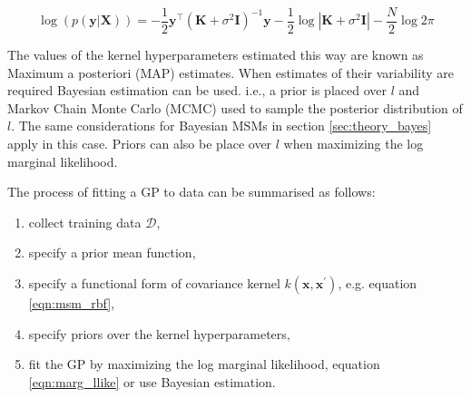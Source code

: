 \begin{equation}\label{eqn:marg_llike}
\log{\left( p(\mathbf{y} | \mathbf{X})\right)}=-\frac{1}{2} \mathbf{y}^{\top}\left(\mathbf{K}+\sigma^{2} \mathbf{I}\right)^{-1} \mathbf{y}-\frac{1}{2} \log \left|\mathbf{K}+\sigma^{2} \mathbf{I}\right|-\frac{N}{2} \log 2 \pi
\end{equation}

The values of the kernel hyperparameters estimated this way are known as Maximum a posteriori (MAP) estimates.\cite{rasmussenGaussianProcessesMachine2006} When estimates of their variability are required Bayesian estimation can be used.\cite{gelmanBayesianDataAnalysis2014} i.e., a prior is placed over $l$ and Markov Chain Monte Carlo (MCMC) used to sample the posterior distribution of $l$. The same considerations for Bayesian MSMs in section \ref{sec:theory_bayes} apply in this case. Priors can also be place over $l$ when maximizing the log marginal likelihood.\cite{rasmussenGaussianProcessesMachine2006}

The process of fitting a GP to data can be summarised as follows:
\begin{enumerate}
    \item collect training data $\mathcal{D}$, 
    \item specify a prior mean function, 
    \item  specify a functional form of covariance kernel $k(\mathbf{x}, \mathbf{x}^{\prime})$, e.g. equation \ref{eqn:msm_rbf}, 
    \item specify priors over the kernel hyperparameters, 
    \item fit the GP by maximizing the log marginal likelihood, equation \ref{eqn:marg_llike} or use Bayesian estimation. 
\end{enumerate}

